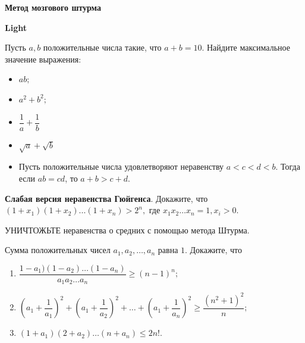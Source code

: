\centerline{\bf \Huge Метод мозгового штурма}
\centerline{\bf \Huge Light}

\begin{flushright}
        \scriptsize{}
\end{flushright}

Пусть $a, b$ положительные числа такие, что $a+b = 10$. Найдите максимальное значение выражения:

\begin{itemize}
    \item[a)] $ab;$
    \item[b)] $a^2 + b^2;$
    \item[c)] $\dfrac{1}{a} + \dfrac{1}{b}$
    \item[d)] $\sqrt{a} + \sqrt{b}$
    \item[e)] Пусть положительные числа удовлетворяют неравенству $a < c < d < b.$
Тогда если $ab = cd$, то $a + b > c + d.$
\end{itemize}

\textbf{Слабая версия неравенства Гюйгенса}. Докажите, что $(1 + x_1)(1 + x_2)...(1 + x_n) > 2^n,$ где $x_1x_2\ldots x_n = 1, x_i > 0.$

УНИЧТОЖЬТЕ неравенства о средних с помощью метода Штурма.

Сумма положительных чисел $a_1, a_2, \ldots, a_n$ равна $1$. Докажите, что  

\begin{enumerate}
    \item   $\dfrac{1-a_1)(1-a_2)…(1-a_n)}{a_1a_2 \ldots a_n} \geq (n-1)^n;$
    \item  $\left( a_1 + \dfrac{1}{a_1}\right)^2 + \left( a_1 + \dfrac{1}{a_2}\right)^2 + \ldots + \left(  a_1 + \dfrac{1}{a_n}\right)^2 \geq \dfrac{(n^2+1)^2}{n};$
    \item $(1 + a_1)(2 + a_2) \ldots (n + a_n) \leq 2n!.$
\end{enumerate}